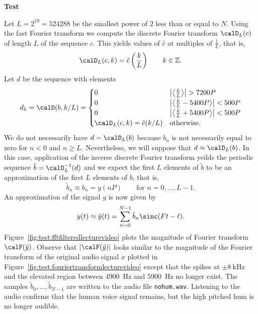 \documentclass[11pt,a4paper]{book}
\theoremstyle{plain}
\numberwithin{equation}{section}
\newcommand{\ints}{{\mathbb Z}}
\newcommand{\abs}[1]{\left\vert #1 \right\vert}
\newcommand{\fracpart}[1]{\left\langle #1 \right\rangle}
\newcounter{test}
\newenvironment{test}{
\begin{shaded}\refstepcounter{test}\par\noindent%
\textbf{Test \thetest}
}{
\end{shaded}
}
\begin{document}
\begin{test}
Let $L = 2^{19} = 524288$ be the smallest power of $2$ less than or equal to $N$. Using the fast Fourier transform we compute the discrete Fourier transform $\calD_L(c)$ of length $L$ of the sequence $c$.  This yields values of $\hat{c}$ at multiples of $\tfrac{1}{L}$, that is,
\[
\calD_L(c,k) = \hat{c}\left( \frac{k}{L} \right) \qquad k \in \ints.
\]
Let $d$ be the sequence with elements 
\[
d_k = \calD(b,k/L) = \begin{cases}
0 & \abs{\fracpart{\frac{k}{L}}} > 7200P \\
0 & \abs{\fracpart{\frac{k}{L}-5400P}} < 500P \\
0 & \abs{\fracpart{\frac{k}{L}+5400P}} < 500P \\
\calD_L(c,k) = \hat{c}(k/L) & \text{otherwise}.
\end{cases}
\]
We do not necessarily have $d = \calD_L(b)$ because $b_n$ is not necessarily equal to zero for $n < 0$ and $n \geq L$.  Nevertheless, we will suppose that $d \approx \calD_L(b)$.  In this case, application of the inverse discrete Fourier transform yeilds the periodic sequence $\tilde{b} = \calD_L^{-1}(d)$ and we expect the first $L$ elements of $\tilde{b}$ to be an approximation of the first $L$ elements of $b$, that is, 
\[
\tilde{b}_n \approx b_n = y(nP) \qquad \text{for $n = 0, \dots, L-1$}.
\]  
An approximation of the signal $y$ is now given by
\[
y(t) \approx \tilde{y}(t) = \sum_{n = 0}^{N-1} \tilde{b}_n \sinc(F t - \ell).
\]
Figure~\ref{fig:test:fftfilteredlecturevideo} plots the magnitude of Fourier transform $\calF(\tilde{y})$.  Observe that $\abs{\calF(\tilde{y})}$ looks similar to the magnitude of the Fourier transform of the original audio signal $x$ plotted in Figure~\ref{fig:test:fouriertransformlecturevideo} except that the spikes at $\pm\SI{8}{\kilo\hertz}$ and the elevated region between \SI{4900}{\hertz} and \SI{5900}{\hertz} no longer exist.  The samples $\tilde{b}_0,\dots,\tilde{b}_{N-1}$ are written to the audio file \texttt{nohum.wav}. Listening to the audio confirms that the human voice signal remains, but the high pitched hum is no longer audible.

\end{test}
\end{document}
